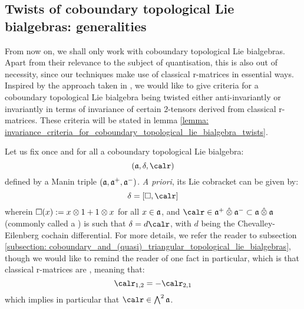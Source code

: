     \subsection{Twists of coboundary topological Lie bialgebras: generalities} \label{subsection: twisted_coboundary_topological_lie_bialgebras_generalities}
        From now on, we shall only work with coboundary topological Lie bialgebras. Apart from their relevance to the subject of quantisation, this is also out of necessity, since our techniques make use of classical r-matrices in essential ways. Inspired by the approach taken in \cite{schrader_integrable_systems_from_classical_reflection_equations}, we would like to give criteria for a coboundary topological Lie bialgebra being twisted either anti-invariantly or invariantly in terms of invariance of certain $2$-tensors derived from classical r-matrices. These criteria will be stated in lemma \ref{lemma: invariance_criteria_for_coboundary_topological_lie_bialgebra_twists}.

        Let us fix once and for all a coboundary topological Lie bialgebra:
            $$(\a, \delta, \calr)$$
        defined by a Manin triple $(\mathfrak{a}, \mathfrak{a}^+, \mathfrak{a}^-)$. \textit{A priori}, its Lie cobracket can be given by:
            $$\delta = [ \Box, \calr ]$$
        wherein $\Box(x) := x \tensor 1 + 1 \tensor x$ for all $x \in \mathfrak{a}$, and $\calr \in \a^+ \hattensor \a^- \subset \a \hattensor \a$ (commonly called a ) is such that $\delta = d\calr$, with $d$ being the Chevalley-Eilenberg cochain differential. For more details, we refer the reader to subsection \ref{subsection: coboundary_and_(quasi)_triangular_topological_lie_bialgebras}, though we would like to remind the reader of one fact in particular, which is that classical r-matrices are , meaning that:
            $$\calr_{1, 2} = -\calr_{2, 1}$$
        which implies in particular that $\calr \in \bigwedge^2 \a$.
        
